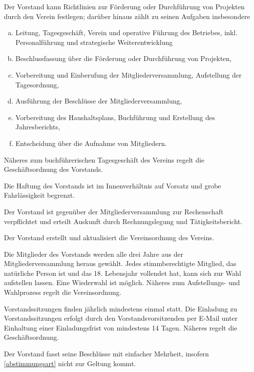 \begin{contract}
    Der Vorstand kann Richtlinien zur Förderung oder Durchführung von Projekten durch den Verein festlegen; darüber hinaus zählt zu seinen Aufgaben insbesondere
    \begin{enumerate}[(a)]
        \item Leitung, Tagesgeschäft, Verein und operative Führung des Betriebes, inkl. Personalführung und strategische Weiterentwicklung
        \item Beschlussfassung über die Förderung oder Durchführung von Projekten,
        \item Vorbereitung und Einberufung der Mitgliederversammlung, Aufstellung der Tagesordnung,
        \item Ausführung der Beschlüsse der Mitgliederversammlung,
        \item Vorbereitung des Haushaltsplans, Buchführung und Erstellung des Jahresberichts,
        \item Entscheidung über die Aufnahme von Mitgliedern.
    \end{enumerate}
    Näheres zum buchführerischen Tagesgeschäft des Vereins regelt die Geschäftsordnung des Vorstands.

    Die Haftung des Vorstands ist im Innenverhältnis auf Vorsatz und grobe Fahrlässigkeit begrenzt.

    Der Vorstand ist gegenüber der Mitgliederversammlung zur Rechenschaft verpflichtet und erteilt Auskunft durch Rechnungslegung und Tätigkeitsbericht.

    Der Vorstand erstellt und aktualisiert die Vereinsordnung des Vereins.


    Die Mitglieder des Vorstands werden alle drei Jahre aus der Mitgliederversammlung heraus
    gewählt. Jedes stimmberechtigte Mitglied, das natürliche Person ist und das 18. Lebensjahr
    vollendet hat, kann sich zur Wahl aufstellen lassen. Eine Wiederwahl ist möglich. Näheres zum Aufstellungs- und Wahlprozess regelt die Vereinsordnung.

    Vorstandssitzungen finden jährlich mindestens einmal statt. Die Einladung zu Vorstandssitzungen erfolgt durch den Vorstandsvorsitzenden per E-Mail unter Einhaltung einer Einladungsfrist von mindestens 14 Tagen. Näheres regelt die Geschäftsordnung.

    Der Vorstand fasst seine Beschlüsse mit einfacher Mehrheit, insofern \ref{abstimmungsart} nicht zur Geltung kommt.


\end{contract}
